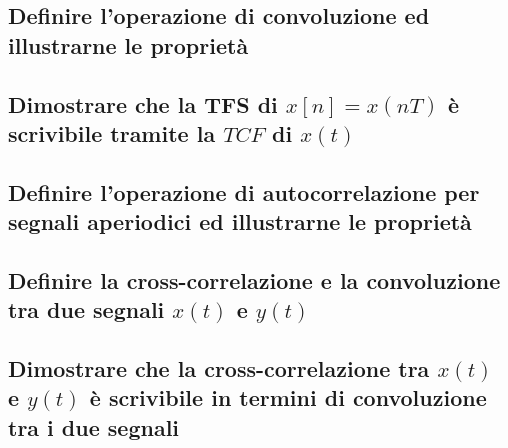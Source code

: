\documentclass[12pt,oneside,openany]{memoir}
\numberwithin{equation}{subsection}
\begin{document}
\subsection{Definire l'operazione di convoluzione ed illustrarne le propriet\`a}


\subsection{Dimostrare che la TFS di $x[n] = x(nT)$ \`e scrivibile tramite la
$TCF$ di $x(t)$}


\subsection{Definire l'operazione di autocorrelazione per segnali aperiodici ed
illustrarne le propriet\`a}


\subsection{Definire la cross-correlazione e la convoluzione tra due segnali
$x(t)$ e $y(t)$}


\subsection{Dimostrare che la cross-correlazione tra $x(t)$ e $y(t)$ \`e
scrivibile in termini di convoluzione tra i due segnali}
\end{document}
